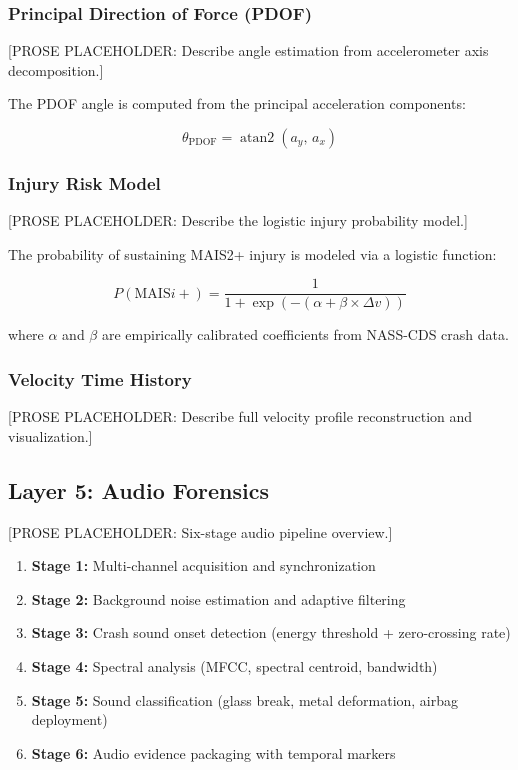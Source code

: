 \documentclass[conference,twocolumn]{IEEEtran}
\begin{document}
\subsubsection{Principal Direction of Force (PDOF)}

[PROSE PLACEHOLDER: Describe angle estimation from accelerometer axis decomposition.]

The PDOF angle is computed from the principal acceleration components:

\begin{equation}
\label{eq:pdof}
\theta_{\text{PDOF}} = \operatorname{atan2}\!\left(a_y,\, a_x\right)
\end{equation}

\subsubsection{Injury Risk Model}

[PROSE PLACEHOLDER: Describe the logistic injury probability model.]

The probability of sustaining MAIS2+ injury is modeled via a logistic function:

\begin{equation}
\label{eq:injury}
P(\text{MAIS}i+) = \frac{1}{1 + \exp\!\left(-\left(\alpha + \beta \times \Delta v\right)\right)}
\end{equation}

where $\alpha$ and $\beta$ are empirically calibrated coefficients from NASS-CDS crash data.

\subsubsection{Velocity Time History}

[PROSE PLACEHOLDER: Describe full velocity profile reconstruction and visualization.]

\subsection{Layer 5: Audio Forensics}

[PROSE PLACEHOLDER: Six-stage audio pipeline overview.]

\begin{enumerate}
  \item \textbf{Stage 1:} Multi-channel acquisition and synchronization
  \item \textbf{Stage 2:} Background noise estimation and adaptive filtering
  \item \textbf{Stage 3:} Crash sound onset detection (energy threshold + zero-crossing rate)
  \item \textbf{Stage 4:} Spectral analysis (MFCC, spectral centroid, bandwidth)
  \item \textbf{Stage 5:} Sound classification (glass break, metal deformation, airbag deployment)
  \item \textbf{Stage 6:} Audio evidence packaging with temporal markers
\end{enumerate}
\end{document}
